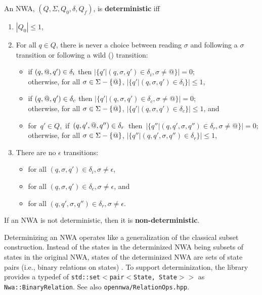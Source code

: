 \begin{definition}
An NWA, $(Q,\Sigma,Q_0,\delta,Q_f)$, is \textbf{deterministic} iff 

\begin{enumerate} 

\item $|Q_0| \leq 1$, 

\item For all $q \in Q$, there is never a choice between reading $\sigma$ and
  following a $\sigma$ transition or following a wild (\wild) transition:
  \begin{itemize}
    \item if $(q,@,q') \in \delta_i$ then $|\{q'|(q,\sigma,q') \in
      \delta_i, {\sigma\neq@}\}| = 0$; \\ otherwise, for all $\sigma \in \Sigma - \{@\}$,
      $|\{q'|(q,\sigma,q') \in \delta_i\}| \leq 1$,

    \item if $(q,@,q') \in \delta_c$ then $ |\{q'|(q,\sigma,q') \in
      \delta_c, {\sigma\neq@}\}| = 0$;\\
      otherwise, for all $\sigma \in \Sigma - \{@\}$,
      $|\{q'|(q,\sigma,q') \in \delta_c\}| \leq 1$, and

    \item \mbox{for $q' \in Q$, if $(q,q',@,q'') \in \delta_r$ then
      $|\{q''|(q,q',\sigma,q'') \in \delta_r, {\sigma\neq@}\}| = 0$;} \\
      otherwise, for all
      $\sigma \in \Sigma - \{@\}$, $|\{q''|(q,q',\sigma,q'') \in \delta_r\}|
      \leq 1$,
  \end{itemize}
\item There are no $\epsilon$ transitions:
 \begin{itemize}
   \item for all $(q,\sigma,q') \in \delta_i, \sigma \neq \epsilon$,
   \item for all $(q,\sigma,q') \in \delta_c, \sigma \neq \epsilon$, and
   \item for all $(q,q',\sigma,q'') \in \delta_r, \sigma \neq \epsilon$.
 \end{itemize}
\end{enumerate}
If an NWA is not deterministic, then it is \textbf{non-deterministic}.
\end{definition}

Determinizing an NWA operates like a
generalization of the classical subset construction.  Instead of the states
in the determinized NWA being subsets of states in the original NWA, states of the
determinized NWA are sets of state pairs (i.e., binary relations on states)
\cite{JACM:AM2009}.  To support determinization, the library provides a
typedef of \texttt{std::set$<$pair$<$State, State$>>$} as 
\texttt{Nwa::BinaryRelation}. See also \texttt{opennwa/RelationOps.hpp}.

